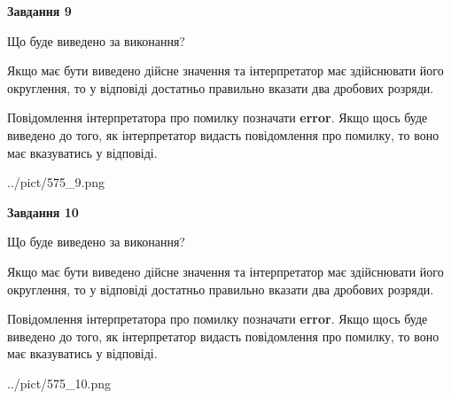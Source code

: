 \documentclass[12pt, ukrainian]{article}
\begin{document}
{\begin {Large}
{\begin {center}\textbf{Завдання 9}\end {center}}\par
Що буде виведено за виконання? \par

Якщо має бути виведено дійсне значення та інтерпретатор має здійснювати його округлення, 
то у відповіді достатньо правильно вказати два дробових розряди.

Повідомлення інтерпретатора про помилку позначати \textbf{error}.
Якщо щось буде виведено до того, як інтерпретатор видасть повідомлення про помилку, 
то воно має вказуватись у відповіді. \par

\begin{center}
	{../pict/575_9.png}
\end{center}
\newpage

{\begin {center}\textbf{Завдання 10}\end {center}}\par
Що буде виведено за виконання? \par

Якщо має бути виведено дійсне значення та інтерпретатор має здійснювати його округлення, 
то у відповіді достатньо правильно вказати два дробових розряди.

Повідомлення інтерпретатора про помилку позначати \textbf{error}.
Якщо щось буде виведено до того, як інтерпретатор видасть повідомлення про помилку, 
то воно має вказуватись у відповіді. \par

\begin{center}
	{../pict/575_10.png}
\end{center}
\newpage

\end {Large}}
\end{document}
